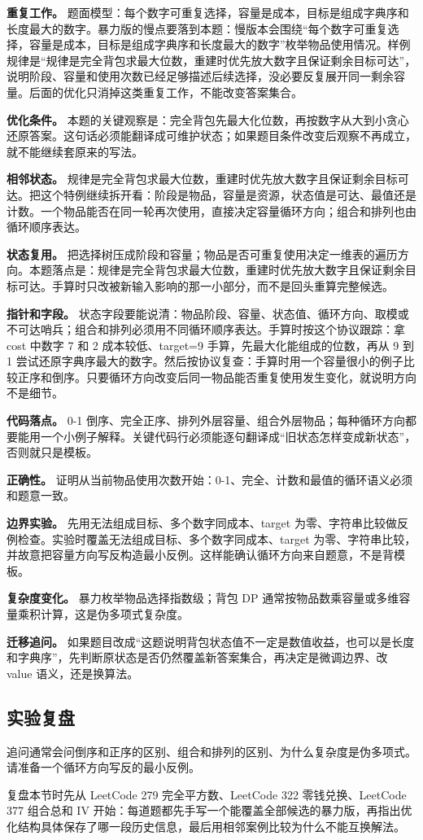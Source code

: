 \textbf{重复工作。} 题面模型：每个数字可重复选择，容量是成本，目标是组成字典序和长度最大的数字。暴力版的慢点要落到本题：慢版本会围绕“每个数字可重复选择，容量是成本，目标是组成字典序和长度最大的数字”枚举物品使用情况。样例规律是“规律是完全背包求最大位数，重建时优先放大数字且保证剩余目标可达”，说明阶段、容量和使用次数已经足够描述后续选择，没必要反复展开同一剩余容量。后面的优化只消掉这类重复工作，不能改变答案集合。

\textbf{优化条件。} 本题的关键观察是：完全背包先最大化位数，再按数字从大到小贪心还原答案。这句话必须能翻译成可维护状态；如果题目条件改变后观察不再成立，就不能继续套原来的写法。

\textbf{相邻状态。} 规律是完全背包求最大位数，重建时优先放大数字且保证剩余目标可达。把这个特例继续拆开看：阶段是物品，容量是资源，状态值是可达、最值还是计数。一个物品能否在同一轮再次使用，直接决定容量循环方向；组合和排列也由循环顺序表达。

\textbf{状态复用。} 把选择树压成阶段和容量；物品是否可重复使用决定一维表的遍历方向。本题落点是：规律是完全背包求最大位数，重建时优先放大数字且保证剩余目标可达。手算时只改被新输入影响的那一小部分，而不是回头重算完整候选。

\textbf{指针和字段。} 状态字段要能说清：物品阶段、容量、状态值、循环方向、取模或不可达哨兵；组合和排列必须用不同循环顺序表达。手算时按这个协议跟踪：拿 cost 中数字 7 和 2 成本较低、target=9 手算，先最大化能组成的位数，再从 9 到 1 尝试还原字典序最大的数字。然后按协议复查：手算时用一个容量很小的例子比较正序和倒序。只要循环方向改变后同一物品能否重复使用发生变化，就说明方向不是细节。

\textbf{代码落点。} 0-1 倒序、完全正序、排列外层容量、组合外层物品；每种循环方向都要能用一个小例子解释。关键代码行必须能逐句翻译成“旧状态怎样变成新状态”，否则就只是模板。

\textbf{正确性。} 证明从当前物品使用次数开始：0-1、完全、计数和最值的循环语义必须和题意一致。

\textbf{边界实验。} 先用无法组成目标、多个数字同成本、target 为零、字符串比较做反例检查。实验时覆盖无法组成目标、多个数字同成本、target 为零、字符串比较，并故意把容量方向写反构造最小反例。这样能确认循环方向来自题意，不是背模板。

\textbf{复杂度变化。} 暴力枚举物品选择指数级；背包 DP 通常按物品数乘容量或多维容量乘积计算，这是伪多项式复杂度。

\textbf{迁移追问。} 如果题目改成“这题说明背包状态值不一定是数值收益，也可以是长度和字典序”，先判断原状态是否仍然覆盖新答案集合，再决定是微调边界、改 value 语义，还是换算法。

\subsection{实验复盘}

追问通常会问倒序和正序的区别、组合和排列的区别、为什么复杂度是伪多项式。请准备一个循环方向写反的最小反例。

复盘本节时先从 LeetCode 279 完全平方数、LeetCode 322 零钱兑换、LeetCode 377 组合总和 IV 开始：每道题都先手写一个能覆盖全部候选的暴力版，再指出优化结构具体保存了哪一段历史信息，最后用相邻案例比较为什么不能互换解法。
